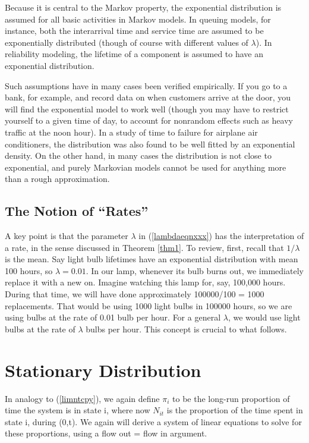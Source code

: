Because it is central to the Markov property, the exponential distribution
is assumed for all basic activities in Markov models. In queuing models,
for instance, both the interarrival time and service time are assumed to
be exponentially distributed (though of course with different values of
$\lambda$). In reliability modeling, the lifetime of a component is
assumed to have an exponential distribution.

Such assumptions have in many cases been verified empirically. If you go to
a bank, for example, and record data on when customers arrive at the
door, you will find the exponential model to work well (though you may
have to restrict yourself to a given time of day, to account for
nonrandom effects such as heavy traffic at the noon hour). In a study of
time to failure for airplane air conditioners, the distribution was also
found to be well fitted by an exponential density.  On the other hand,
in many cases the distribution is not close to exponential, and purely
Markovian models cannot be used for anything more than a rough
approximation.

\subsection{The Notion of ``Rates''}
\label{ratesxxx}

A key point is that the parameter $\lambda$ in (\ref{lambdaeqnxxx}) has
the interpretation of a rate, in the sense discussed in Theorem
\ref{thm1}.  To review, first, recall that $1/\lambda$ is the mean.  Say
light bulb lifetimes have an exponential distribution with mean 100
hours, so $\lambda = 0.01$.  In our lamp, whenever its bulb burns out,
we immediately replace it with a new on.  Imagine watching this lamp
for, say, 100,000 hours.  During that time, we will have done
approximately 100000/100 = 1000 replacements.  That would be using 1000
light bulbs in 100000 hours, so we are using bulbs at the rate of 0.01
bulb per hour.  For a general $\lambda$, we would use light bulbs at the
rate of $\lambda$ bulbs per hour.  This concept is crucial to what
follows.

\section{Stationary Distribution}

In analogy to (\ref{limntcpy}), we again define $\pi_{i}$ to be the
long-run proportion of time the system is in state i, where now $N_{it}$
is the proportion of the time spent in state i, during (0,t).  We again
will derive a system of linear equations to solve for these proportions,
using a flow out = flow in argument.

